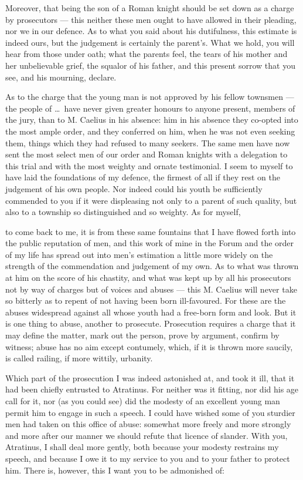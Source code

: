  Moreover, that being the son of a Roman knight should be set down as a charge by prosecutors --- this neither these men ought to have allowed in their pleading, nor we in our defence. As to what you said about his dutifulness, this estimate is indeed ours, but the judgement is certainly the parent's. What we hold, you will hear from those under oath; what the parents feel, the tears of his mother and her unbelievable grief, the squalor of his father, and this present sorrow that you see, and his mourning, declare.

 As to the charge that the young man is not approved by his fellow townsmen --- the people of \dots\ have never given greater honours to anyone present, members of the jury, than to M. Caelius in his absence: him in his absence they co-opted into the most ample order, and they conferred on him, when he was not even seeking them, things which they had refused to many seekers. The same men have now sent the most select men of our order and Roman knights with a delegation to this trial and with the most weighty and ornate testimonial. I seem to myself to have laid the foundations of my defence, the firmest of all if they rest on the judgement of his own people. Nor indeed could his youth be sufficiently commended to you if it were displeasing not only to a parent of such quality, but also to a township so distinguished and so weighty. As for myself,

 to come back to me, it is from these same fountains that I have flowed forth into the public reputation of men, and this work of mine in the Forum and the order of my life has spread out into men's estimation a little more widely on the strength of the commendation and judgement of my own. As to what was thrown at him on the score of his chastity, and what was kept up by all his prosecutors not by way of charges but of voices and abuses --- this M. Caelius will never take so bitterly as to repent of not having been born ill-favoured. For these are the abuses widespread against all whose youth had a free-born form and look. But it is one thing to abuse, another to prosecute. Prosecution requires a charge that it may define the matter, mark out the person, prove by argument, confirm by witness; abuse has no aim except contumely, which, if it is thrown more saucily, is called railing, if more wittily, urbanity.

 Which part of the prosecution I was indeed astonished at, and took it ill, that it had been chiefly entrusted to Atratinus. For neither was it fitting, nor did his age call for it, nor (as you could see) did the modesty of an excellent young man permit him to engage in such a speech. I could have wished some of you sturdier men had taken on this office of abuse: somewhat more freely and more strongly and more after our manner we should refute that licence of slander. With you, Atratinus, I shall deal more gently, both because your modesty restrains my speech, and because I owe it to my service to you and to your father to protect him. There is, however, this I want you to be admonished of:

